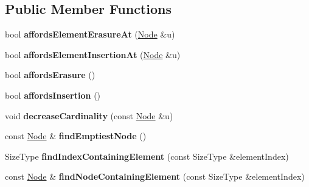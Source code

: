 \subsection*{Public Member Functions}
\begin{DoxyCompactItemize}
\item 
\hypertarget{class_packed_memory_array_helper_a0f53a72b3d553f5394e5c06509aec476}{
bool {\bfseries affordsElementErasureAt} (\hyperlink{class_complete_binary_tree_1_1_node}{Node} \&u)}
\label{class_packed_memory_array_helper_a0f53a72b3d553f5394e5c06509aec476}

\item 
\hypertarget{class_packed_memory_array_helper_a4f2136ce319fedc83e8926120e223a3c}{
bool {\bfseries affordsElementInsertionAt} (\hyperlink{class_complete_binary_tree_1_1_node}{Node} \&u)}
\label{class_packed_memory_array_helper_a4f2136ce319fedc83e8926120e223a3c}

\item 
\hypertarget{class_packed_memory_array_helper_afadad70434b04266ae3e8b5249b82651}{
bool {\bfseries affordsErasure} ()}
\label{class_packed_memory_array_helper_afadad70434b04266ae3e8b5249b82651}

\item 
\hypertarget{class_packed_memory_array_helper_a463c0a5554f8b9a9e81d452646749a4f}{
bool {\bfseries affordsInsertion} ()}
\label{class_packed_memory_array_helper_a463c0a5554f8b9a9e81d452646749a4f}

\item 
\hypertarget{class_packed_memory_array_helper_aa7ea09333d42ef892f8dd4fb9a27ff61}{
void {\bfseries decreaseCardinality} (const \hyperlink{class_complete_binary_tree_1_1_node}{Node} \&u)}
\label{class_packed_memory_array_helper_aa7ea09333d42ef892f8dd4fb9a27ff61}

\item 
\hypertarget{class_packed_memory_array_helper_abf265e1fd4fd8c02fccb180065967286}{
const \hyperlink{class_complete_binary_tree_1_1_node}{Node} \& {\bfseries findEmptiestNode} ()}
\label{class_packed_memory_array_helper_abf265e1fd4fd8c02fccb180065967286}

\item 
\hypertarget{class_packed_memory_array_helper_a0cce2a58150ed15cca6a1f6495160cea}{
SizeType {\bfseries findIndexContainingElement} (const SizeType \&elementIndex)}
\label{class_packed_memory_array_helper_a0cce2a58150ed15cca6a1f6495160cea}

\item 
\hypertarget{class_packed_memory_array_helper_a646d3791d84e2cc2e0744b8b80e717e7}{
const \hyperlink{class_complete_binary_tree_1_1_node}{Node} \& {\bfseries findNodeContainingElement} (const SizeType \&elementIndex)}
\label{class_packed_memory_array_helper_a646d3791d84e2cc2e0744b8b80e717e7}


\end{DoxyCompactItemize}
